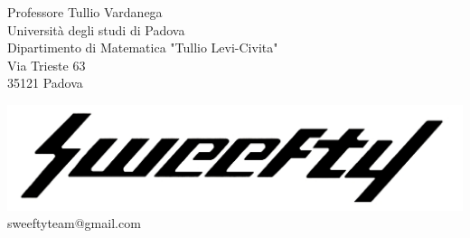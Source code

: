 \documentclass[12pt]{letter} %
\date{11/05/2018} %
\begin{document}



\begin{letter}{Professore Tullio Vardanega \\ Università degli studi di Padova \\ Dipartimento di Matematica "Tullio Levi-Civita" \\ Via Trieste 63 \\ 35121 Padova} %

\begin{center}
\includegraphics[width=\linewidth]{../../CommonImages/logo.jpg}
sweeftyteam@gmail.com
\end{center}


\end{letter}
\end{document}

